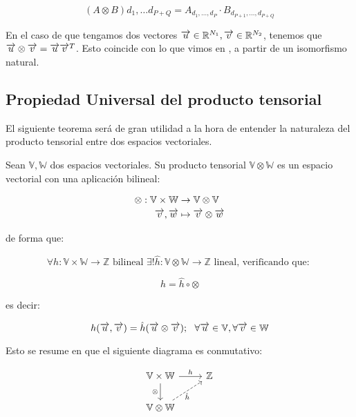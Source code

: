 $$(A \otimes B)d_1, \ldots d_{P + Q} = A_{d_1, \ldots, d_P} \cdot B_{d_{P + 1}, \ldots, d_{P + Q}}$$

En el caso de que tengamos dos vectores $\overrightarrow{u} \in \mathbb{R}^{N_1}, \overrightarrow{v} \in \mathbb{R}^{N_2}$, tenemos que $\overrightarrow{u} \otimes \overrightarrow{v} = \overrightarrow{u} \overrightarrow{v}^T$. Esto coincide con lo que vimos en , a partir de un isomorfismo natural.

\subsection{Propiedad Universal del producto tensorial}

El siguiente teorema será de gran utilidad a la hora de entender la naturaleza del producto tensorial entre dos espacios vectoriales.

\begin{teorema} Sean $\mathbb{V}, \mathbb{W}$ dos espacios vectoriales. Su producto tensorial $\mathbb{V} \otimes \mathbb{W}$ es un espacio vectorial con una aplicación bilineal:

\begin{equation}
\begin{split}
    \otimes : \mathbb{V} \times \mathbb{W} &\to \mathbb{V} \otimes \mathbb{V} \\
    \overrightarrow{v}, \overrightarrow{w} & \mapsto \overrightarrow{v} \otimes \overrightarrow{w}
\end{split}
\end{equation}

de forma que:

\begin{equation}
    \forall h: \mathbb{V} \times \mathbb{W} \to \mathbb{Z} \text{  bilineal  } \exists! \hat{h}: \mathbb{V} \otimes \mathbb{W} \to \mathbb{Z} \text{  lineal, verificando que: }
\end{equation}

\begin{equation}
    h = \hat{h} \circ \otimes
\end{equation}

es decir:

\begin{equation}
    h(\overrightarrow{u}, \overrightarrow{v}) = \hat{h}(\overrightarrow{u} \otimes \overrightarrow{v}); \ \  \forall \overrightarrow{u} \in \mathbb{V}, \forall \overrightarrow{v} \in \mathbb{W}
\end{equation}

Esto se resume en que el siguiente diagrama es conmutativo:

\begin{equation}
\begin{tikzcd}
    \mathbb{V} \times \mathbb{W} \ar{r}{h} \ar{d}[left]{\otimes} & \mathbb{Z} \\
    \mathbb{V} \otimes \mathbb{W} \ar[dashed]{ur}[right, below]{\hat{h}}
\end{tikzcd}
\end{equation}

\end{teorema}

